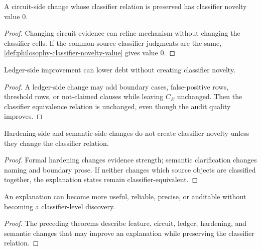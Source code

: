 \begin{theorem}
\label{thm:philosophy-circuit-side-change-no-classifier-novelty}
A circuit-side change whose classifier relation is preserved has
classifier novelty value $0$.
\end{theorem}
\begin{proof}
Changing circuit evidence can refine mechanism without changing the
classifier cells. If the common-source classifier judgments are the same,
\autoref{def:philosophy-classifier-novelty-value} gives value $0$.
\end{proof}

\begin{theorem}
\label{thm:philosophy-ledger-repair-no-classifier-novelty}
Ledger-side improvement can lower debt without creating classifier
novelty.
\end{theorem}
\begin{proof}
A ledger-side change may add boundary cases, false-positive rows,
threshold rows, or not-claimed clauses while leaving $C_E$ unchanged.
Then the classifier equivalence relation is unchanged, even though the
audit quality improves.
\end{proof}

\begin{theorem}
\label{thm:philosophy-hardening-semantic-no-classifier-novelty}
Hardening-side and semantic-side changes do not create classifier novelty
unless they change the classifier relation.
\end{theorem}
\begin{proof}
Formal hardening changes evidence strength; semantic clarification
changes naming and boundary prose. If neither changes which source
objects are classified together, the explanation states remain
classifier-equivalent.
\end{proof}

\begin{corollary}
\label{cor:philosophy-improvement-discovery-distinct}
An explanation can become more useful, reliable, precise, or auditable
without becoming a classifier-level discovery.
\end{corollary}
\begin{proof}
The preceding theorems describe feature, circuit, ledger, hardening, and
semantic changes that may improve an explanation while preserving the
classifier relation.
\end{proof}

